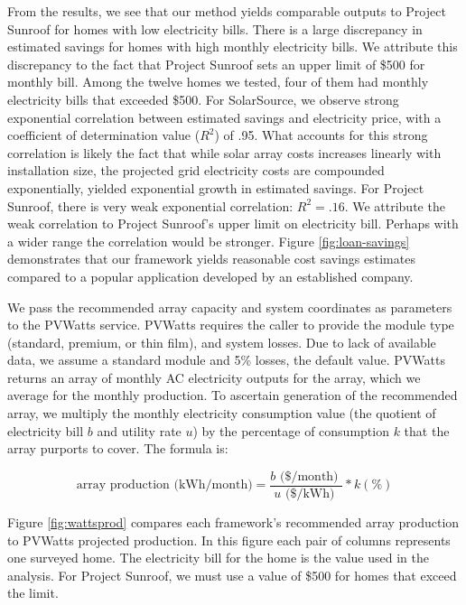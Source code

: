 \documentclass[pageno]{jpaper}
\begin{document}
From the results, we see that our method yields comparable outputs to Project Sunroof for homes with low electricity bills. There is a large discrepancy in estimated savings for homes with high monthly electricity bills. We attribute this discrepancy to the fact that Project Sunroof sets an upper limit of \$500 for monthly bill. Among the twelve homes we tested, four of them had monthly electricity bills that exceeded \$500. For SolarSource, we observe strong exponential correlation between estimated savings and electricity price, with a coefficient of determination value ($R^2$) of .95. What accounts for this strong correlation is likely the fact that while solar array costs increases linearly with installation size, the projected grid electricity costs are compounded exponentially, yielded exponential growth in estimated savings. For Project Sunroof, there is very weak exponential correlation: $R^2 = .16$. We attribute the weak correlation to Project Sunroof's upper limit on electricity bill. Perhaps with a wider range the correlation would be stronger. Figure \ref{fig:loan-savings} demonstrates that our framework yields reasonable cost savings estimates compared to a popular application developed by an established company.

We pass the recommended array capacity and system coordinates as parameters to the PVWatts service. PVWatts requires the caller to provide the module type (standard, premium, or thin film), and system losses. Due to lack of available data, we assume a standard module and 5\% losses, the default value. PVWatts returns an array of monthly AC electricity outputs for the array, which we average for the monthly production. To ascertain generation of the recommended array, we multiply the monthly electricity consumption value (the quotient of electricity bill $b$ and utility rate $u$) by the percentage of consumption $k$ that the array purports to cover. The formula is:

\[ \mbox{array production (kWh/month)} = \frac{b \mbox{ (\$/month) }}{ u \mbox{ (\$/kWh) }} * k (\%) \]

Figure \ref{fig:wattsprod} compares each framework's recommended array production to PVWatts projected production. In this figure each pair of columns represents one surveyed home. The electricity bill for the home is the value used in the analysis. For Project Sunroof, we must use a value of \$500 for homes that exceed the limit.
\end{document}
